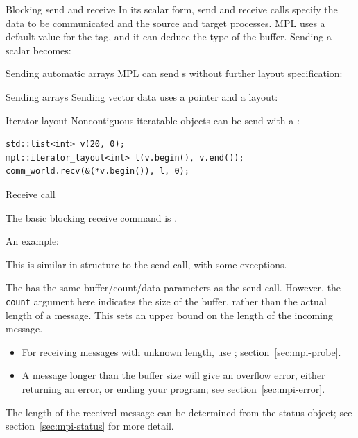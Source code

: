 \begin{mplnote}{Blocking send and receive}
  In its scalar form, send and receive calls specify the data
  to be communicated and the source and target processes.
  \ac{MPL} uses a default value for the tag, and it can deduce the type
  of the buffer. Sending a scalar becomes:
\end{mplnote}

\begin{mplnote}{Sending automatic arrays}
  \ac{MPL} can send s
  without further layout specification:
\end{mplnote}

\begin{mplnote}{Sending arrays}
  Sending vector data uses a pointer and a layout:
\end{mplnote}

\begin{mplnote}{Iterator layout}
  Noncontiguous iteratable objects can be send with a
  :
\begin{lstlisting}
std::list<int> v(20, 0);
mpl::iterator_layout<int> l(v.begin(), v.end());
comm_world.recv(&(*v.begin()), l, 0);  
\end{lstlisting}
\end{mplnote}

 {Receive call}

The basic blocking receive command is
.

An example:
%

This is similar in structure to the send call, with some exceptions.

The  has the same buffer/count/data parameters as the send
call.
However, 
the \lstinline{count} argument here indicates the size of the buffer,
rather than the actual length of a message.
This sets an upper bound on the length of the incoming message.
\begin{itemize}
\item For receiving messages with unknown length, use ;
  section~\ref{sec:mpi-probe}.
\item A message longer than the buffer size will give an overflow error,
  either returning an error, or ending your program; see section~\ref{sec:mpi-error}.
\end{itemize}
The length of the received message can be determined 
from the status object; see section~\ref{sec:mpi-status} for more detail.

